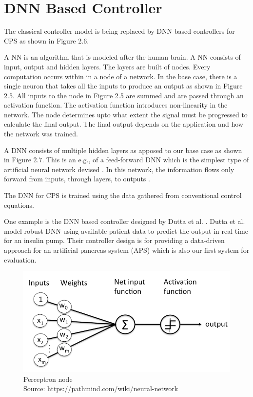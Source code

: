   
\section{DNN Based Controller}
The classical controller model is being replaced by DNN based controllers for CPS as shown in  Figure 2.6.

A \ac{NN} is an algorithm that is modeled after the human brain.
A \ac{NN} consists of input, output and hidden layers. 
The layers are built of nodes. Every computation occurs within in a node of a network.
In the base case, there is a single neuron that takes all the inputs to produce an output as shown in Figure 2.5. 
All inputs to the node in Figure 2.5 are summed and are passed through an activation function. 
The activation function introduces non-linearity in the network. 
The node determines upto what extent the signal must be progressed to calculate the final output. 
The final output depends on the application and how the network was trained. 


A \ac{DNN} consists of multiple hidden layers as apposed to our base case  as shown in Figure 2.7.
This is an e.g., of a feed-forward \ac{DNN} which is the simplest type of artificial neural network devised \cite{feedforward}.
In this network, the information flows only forward from inputs, through layers, to outputs \cite{Zell}. 


The \ac{DNN} for \ac*{CPS} is trained using the data gathered from conventional control equations. 

One example is the DNN based controller designed by Dutta et al. \cite{Dutta_Others__2018__Robust}. Dutta et al. model robust DNN using available patient data to predict the output in real-time for an insulin pump. Their controller design is for providing a data-driven approach for an artificial pancreas system (APS) which is also our first system for evaluation. 

\begin{figure}
	\centering
	\includegraphics[width=0.7\linewidth]{Images/perceptron_node}
	\caption{Perceptron node  \\ Source: https://pathmind.com/wiki/neural-network}
	\label{fig:perceptronnode}
\end{figure}

